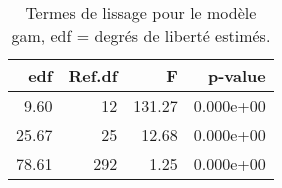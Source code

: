 \begin{table}[!ht]
\centering
\begin{tabular}{rrrr}
  \hline
edf & Ref.df & F & p-value \\ 
  \hline
9.60 & 12 & 131.27 & 0.000e+00 \\ 
  25.67 & 25 & 12.68 & 0.000e+00 \\ 
  78.61 & 292 & 1.25 & 0.000e+00 \\ 
   \hline
\end{tabular}
\caption{Termes de lissage pour le modèle gam, edf = degrés de liberté estimés.} 
\label{smpm.st}
\end{table}
